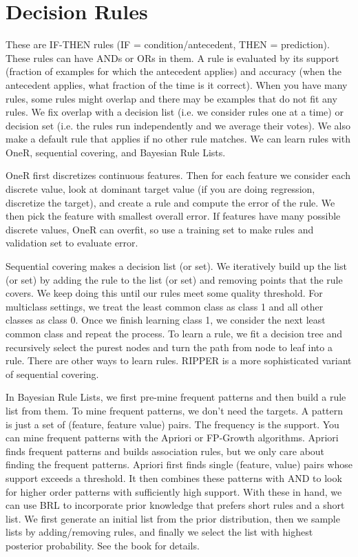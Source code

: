 \documentclass[a4paper]{article}
\begin{document}
\section{Decision Rules}
These are IF-THEN rules (IF = condition/antecedent, THEN = prediction). These
rules can have ANDs or ORs in them. A rule is evaluated by its support (fraction
of examples for which the antecedent applies) and accuracy (when the antecedent
applies, what fraction of the time is it correct). When you have many rules,
some rules might overlap and there may be examples that do not fit any rules.
We fix overlap with a decision list (i.e. we consider rules one at a time) or
decision set (i.e. the rules run independently and we average their votes). We
also make a default rule that applies if no other rule matches. We can learn
rules with OneR, sequential covering, and Bayesian Rule Lists.

OneR first discretizes continuous features. Then for each feature we consider
each discrete value, look at dominant target value (if you are doing regression,
discretize the target), and create a rule and
compute the error of the rule. We then pick the feature with smallest overall
error. If features have many possible discrete values, OneR can overfit, so use
a training set to make rules and validation set to evaluate error.

Sequential covering makes a decision list (or set). We iteratively build up
the list (or set) by adding the rule to the list (or set) and removing points
that the rule covers. We keep doing this until our rules meet some quality
threshold. For multiclass settings, we treat the least common class as class 1
and all other classes as class 0. Once we finish learning class 1, we consider
the next least common class and repeat the process. To learn a rule, we fit
a decision tree and recursively select the purest nodes and turn the path from
node to leaf into a rule. There are other ways to learn rules. RIPPER is a
more sophisticated variant of sequential covering.

In Bayesian Rule Lists, we first pre-mine frequent patterns and then build
a rule list from them. To mine frequent patterns, we don't need the targets.
A pattern is just a set of (feature, feature value) pairs. The frequency is
the support. You can mine frequent patterns with the Apriori or FP-Growth
algorithms. Apriori finds frequent patterns and builds association rules, but we
only care about finding the frequent patterns. Apriori first finds single
(feature, value) pairs whose support exceeds a threshold. It then combines
these patterns with AND to look for higher order patterns with sufficiently
high support. With these in hand, we can use BRL to incorporate prior knowledge
that prefers short rules and a short list. We first generate an initial list
from the prior distribution, then we sample lists by adding/removing rules,
and finally we select the list with highest posterior probability. See the book
for details.
\end{document}
